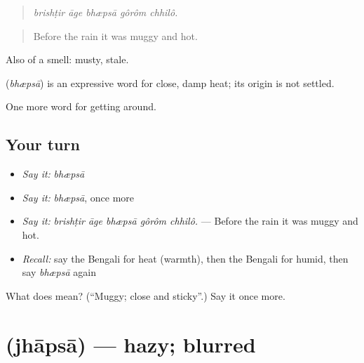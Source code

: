 \begin{quote}
    
\end{quote}

\begin{quote}
\emph{brishṭir āge bhæpsā gôrôm chhilô.}
\end{quote}

\begin{quote}
Before the rain it was muggy and hot.
\end{quote}

Also of a smell: musty, stale.

\begin{cousinweb}
\textbf{} (\emph{bhæpsā}) is an expressive word for close, damp heat; its origin is not settled.
\end{cousinweb}

\begin{grammarlens}[title={What you've built}]
One more word for getting around.
\end{grammarlens}

\subsection*{Your turn}
\begin{itemize}
\raggedright
  \item \emph{Say it:} \emph{bhæpsā}
  \item \emph{Say it:} \emph{bhæpsā}, once more
  \item \emph{Say it:} \emph{brishṭir āge bhæpsā gôrôm chhilô.} — Before the rain it was muggy and hot.
  \item \emph{Recall:} say the Bengali for heat (warmth), then the Bengali for humid, then say \emph{bhæpsā} again
\end{itemize}

\begin{tcolorbox}[breakable,colback=teal!4,colframe=teal!35!black,title={Before you move on}]
What does  mean? (\textquotedblleft{}Muggy; close and sticky\textquotedblright{}.) Say it once more.
\end{tcolorbox}
\section[\texorpdfstring{\bn{ঝাপসা} (jhāpsā)}{ঝাপসা (jhāpsā)}]{ (jhāpsā) — hazy; blurred}

\label{lesson:BN-C428-jhapsa}



